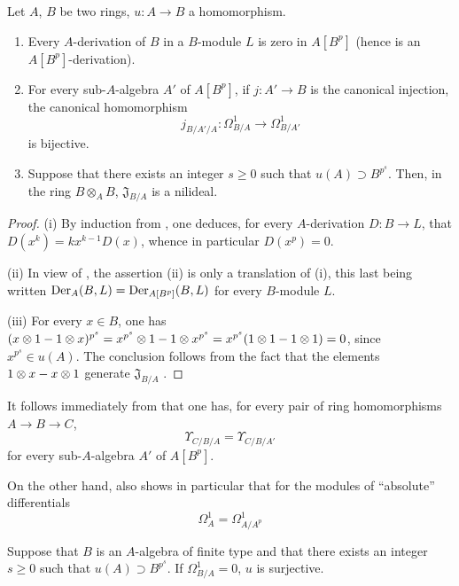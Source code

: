 \begin{proposition}[21.1.5]
\label{0.21.1.5}
Let $A$, $B$ be two rings, $u:A\to B$ a homomorphism.
\begin{enumerate}
  \item[\rm(i)] Every $A$-derivation of $B$ in a $B$-module $L$ is zero in $A[B^p]$ \textup{(}hence is an $A[B^p]$-derivation\textup{)}.
  \item[\rm\textup{(ii)}] For every sub-$A$-algebra $A'$ of $A[B^p]$, if $j:A'\to B$ is the canonical injection, the canonical homomorphism
\[
  j_{B/A'/A}:\Omega^1_{B/A}\to\Omega^1_{B/A'}
\]
is bijective.
  \item[\rm\textup{(iii)}] Suppose that there exists an integer $s\geq 0$ such that $u(A)\supset B^{p^s}$.
  Then, in the ring $B\otimes_A B$, $\mathfrak{J}_{B/A}$ is a nilideal.
\end{enumerate}
\end{proposition}

\begin{proof}
(i) By induction from , one deduces, for every $A$-derivation $D:B\to L$, that $D(x^k)=kx^{k-1}D(x)$, whence in particular $D(x^p)=0$.

(ii) In view of , the assertion (ii) is only a translation of (i), this last being written $\operatorname{Der}_A(B,L)=\operatorname{Der}_{A[B^p]}(B,L)$ for every $B$-module $L$.

(iii) For every $x\in B$, one has $(x\otimes 1-1\otimes x)^{p^s}=x^{p^s}\otimes 1-1\otimes x^{p^s}=x^{p^s}(1\otimes 1-1\otimes 1)=0$, since $x^{p^s}\in u(A)$.
The conclusion follows from the fact that the elements $1\otimes x- x\otimes 1$ generate $\mathfrak{J}_{B/A}$ .
\end{proof}

It follows immediately from  that one has, for every pair of ring homomorphisms $A\to B\to C$,
\begin{equation}
\tag{21.1.5.1}
  \label{0.21.1.5.1}
  \Upsilon_{C/B/A}=\Upsilon_{C/B/A'}
\end{equation}
for every sub-$A$-algebra $A'$ of $A[B^p]$.

On the other hand,  also shows in particular that for the modules of ``absolute'' differentials
\begin{equation}
\tag{21.1.5.2}
  \label{0.21.1.5.2}
  \Omega^1_A=\Omega^1_{A/A^p}
\end{equation}

\begin{corollary}[21.1.6]
\label{0.21.1.6}
Suppose that $B$ is an $A$-algebra of finite type and that there exists an integer $s\geq 0$ such that $u(A)\supset B^{p^s}$.
If $\Omega^1_{B/A}=0$, $u$ is surjective.
\end{corollary}

